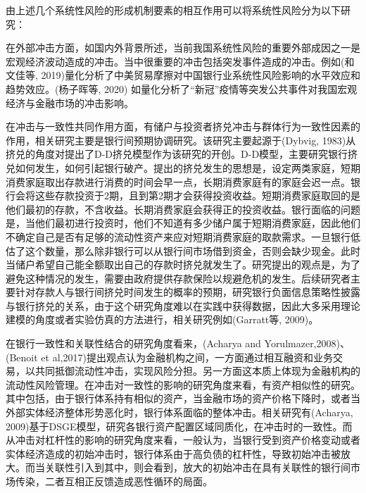 由上述几个系统性风险的形成机制要素的相互作用可以将系统性风险分为以下研究：

在外部冲击方面，如国内外背景所述，当前我国系统性风险的重要外部成因之一是宏观经济波动造成的冲击。当中很重要的冲击包括突发事件造成的冲击。例如(和文佳等, 2019)量化分析了中美贸易摩擦对中国银行业系统性风险影响的水平效应和趋势效应。(杨子晖等, 2020) 如量化分析了“新冠”疫情等突发公共事件对我国宏观经济与金融市场的冲击影响。

在冲击与一致性共同作用方面，有储户与投资者挤兑冲击与群体行为一致性因素的作用，相关研究主要是银行间预期协调研究。该研究主要起源于(Dybvig, 1983)从挤兑的角度对提出了D-D挤兑模型作为该研究的开创。D-D模型，主要研究银行挤兑如何发生，如何引起银行破产。提出的挤兑发生的思想是，设定两类家庭，短期消费家庭取出存款进行消费的时间会早一点，长期消费家庭有的家庭会迟一点。银行会将这些存款投资于2期，且到第2期才会获得投资收益。短期消费家庭取回的是他们最初的存款，不含收益。长期消费家庭会获得正的投资收益。银行面临的问题是，当他们最初进行投资时，他们不知道有多少储户属于短期消费家庭，因此他们不确定自己是否有足够的流动性资产来应对短期消费家庭的取款需求。一旦银行低估了这个数量，那么除非银行可以从银行间市场借到资金，否则会缺少现金。此时当储户希望自己能全额取出自己的存款时挤兑就发生了。研究提出的观点是，为了避免这种情况的发生，需要由政府提供存款保险以规避危机的发生。后续研究者主要针对存款人与银行间挤兑时间发生的概率的预期，研究银行负面信息策略性披露与银行挤兑的关系，由于这个研究角度难以在实践中获得数据，因此大多采用理论建模的角度或者实验仿真的方法进行，相关研究例如(Garratt等, 2009)。

在银行一致性和关联性结合的研究角度看来，(Acharya and Yorulmazer,2008)、(Benoit et al,2017)提出观点认为金融机构之间，一方面通过相互融资和业务交易，以共同抵御流动性冲击，实现风险分担。另一方面这本质上体现为金融机构的流动性风险管理。在冲击对一致性的影响的研究角度来看，有资产相似性的研究。其中包括，由于银行体系持有相似的资产，当金融市场的资产价格下降时，或者当外部实体经济整体形势恶化时，银行体系面临的整体冲击。相关研究有(Acharya, 2009)基于DSGE模型，研究各银行资产配置区域同质化，在冲击时的一致性。而从冲击对杠杆性的影响的研究角度来看，一般认为，当银行受到资产价格变动或者实体经济造成的初始冲击时，银行体系由于高负债的杠杆性，导致初始冲击被放大。而当关联性引入到其中，则会看到，放大的初始冲击在具有关联性的银行间市场传染，二者互相正反馈造成恶性循环的局面。

